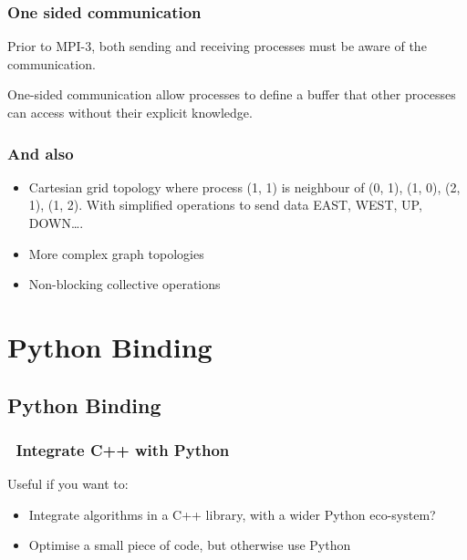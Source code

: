 \subsubsection{One sided communication}\label{one-sided-communication}

Prior to MPI-3, both sending and receiving processes must be aware of
the communication.

One-sided communication allow processes to define a buffer that other
processes can access without their explicit knowledge.

\subsubsection{And also}\label{and-also}

\begin{itemize}
\itemsep1pt\parskip0pt
\item
  Cartesian grid topology where process (1, 1) is neighbour of (0, 1),
  (1, 0), (2, 1), (1, 2). With simplified operations to send data EAST,
  WEST, UP, DOWN\ldots{}.
\item
  More complex graph topologies
\item
  Non-blocking collective operations
\end{itemize}

\section{Python Binding}\label{python-binding}

\subsection{Python Binding}\label{python-binding-1}

\subsubsection{~Integrate C++ with
Python}\label{integrate-c-with-python}

Useful if you want to:

\begin{itemize}
\itemsep1pt\parskip0pt
\item
  Integrate algorithms in a C++ library, with a wider Python eco-system?
\item
  Optimise a small piece of code, but otherwise use Python
\end{itemize}

